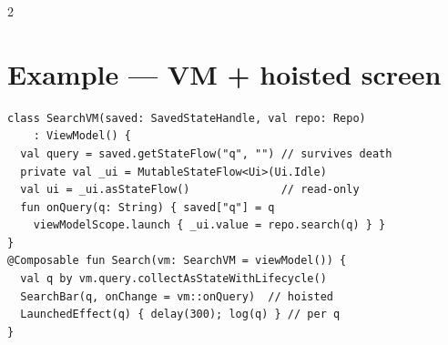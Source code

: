 \documentclass[8pt]{extarticle}
\begin{document}
\begin{multicols}{2}
\section{Example — VM + hoisted screen}
\begin{lstlisting}[language=KotlinSheet]
class SearchVM(saved: SavedStateHandle, val repo: Repo)
    : ViewModel() {
  val query = saved.getStateFlow("q", "") // survives death
  private val _ui = MutableStateFlow<Ui>(Ui.Idle)
  val ui = _ui.asStateFlow()              // read-only
  fun onQuery(q: String) { saved["q"] = q
    viewModelScope.launch { _ui.value = repo.search(q) } }
}
@Composable fun Search(vm: SearchVM = viewModel()) {
  val q by vm.query.collectAsStateWithLifecycle()
  SearchBar(q, onChange = vm::onQuery)  // hoisted
  LaunchedEffect(q) { delay(300); log(q) } // per q
}
\end{lstlisting}

\columnbreak


\end{multicols}
\end{document}
